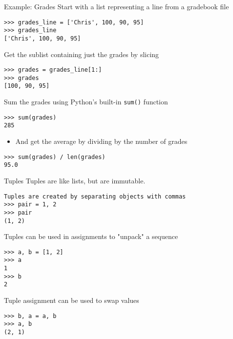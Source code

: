 \documentclass[smaller, aspectratio=1610]{beamer}
\begin{document}
\begin{frame}[label={sec:org7c98d70},fragile]{Example: Grades}
 Start with a list representing a line from a gradebook file

\lstset{language=Python,label= ,caption= ,captionpos=b,numbers=none}
\begin{lstlisting}
>>> grades_line = ['Chris', 100, 90, 95]
>>> grades_line
['Chris', 100, 90, 95]
\end{lstlisting}

Get the sublist containing just the grades by slicing

\lstset{language=Python,label= ,caption= ,captionpos=b,numbers=none}
\begin{lstlisting}
>>> grades = grades_line[1:]
>>> grades
[100, 90, 95]
\end{lstlisting}

Sum the grades using Python's built-in \texttt{sum()} function

\lstset{language=Python,label= ,caption= ,captionpos=b,numbers=none}
\begin{lstlisting}
>>> sum(grades)
285
\end{lstlisting}

\begin{itemize}
\item And get the average by dividing by the number of grades
\end{itemize}

\lstset{language=Python,label= ,caption= ,captionpos=b,numbers=none}
\begin{lstlisting}
>>> sum(grades) / len(grades)
95.0
\end{lstlisting}
\end{frame}

\begin{frame}[label={sec:orgca2b392},fragile]{Tuples}
 Tuples are like lists, but are immutable.

\lstset{language=Python,label= ,caption= ,captionpos=b,numbers=none}
\begin{lstlisting}
Tuples are created by separating objects with commas
>>> pair = 1, 2
>>> pair
(1, 2)
\end{lstlisting}

Tuples can be used in assignments to "unpack" a sequence

\lstset{language=Python,label= ,caption= ,captionpos=b,numbers=none}
\begin{lstlisting}
>>> a, b = [1, 2]
>>> a
1
>>> b
2
\end{lstlisting}

Tuple assignment can be used to swap values

\lstset{language=Python,label= ,caption= ,captionpos=b,numbers=none}
\begin{lstlisting}
>>> b, a = a, b
>>> a, b
(2, 1)
\end{lstlisting}
\end{frame}
\end{document}
